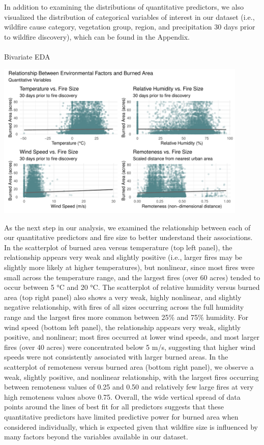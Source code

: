 \documentclass[
  letterpaper,
  DIV=11,
  numbers=noendperiod]{scrartcl}
\makeatletter
\let\oldparagraph\paragraph
\renewcommand{\paragraph}{
    \@ifstar
      \xxxParagraphStar
      \xxxParagraphNoStar
  }
\newcommand{\xxxParagraphStar}[1]{\oldparagraph*{#1}\mbox{}}
\newcommand{\xxxParagraphNoStar}[1]{\oldparagraph{#1}\mbox{}}
\makeatother
\begin{document}
In addition to examining the distributions of quantitative predictors,
we also visualized the distribution of categorical variables of interest
in our dataset (i.e., wildfire cause category, vegetation group, region,
and precipitation 30 days prior to wildfire discovery), which can be
found in the Appendix.

\FloatBarrier

\paragraph{Bivariate EDA}\label{bivariate-eda}

\includegraphics[width=0.9\textwidth,height=\textheight]{written-report_files/figure-pdf/fire-size-bivariate-1.pdf}

As the next step in our analysis, we examined the relationship between
each of our quantitative predictors and fire size to better understand
their associations. In the scatterplot of burned area versus temperature
(top left panel), the relationship appears very weak and slightly
positive (i.e., larger fires may be slightly more likely at higher
temperatures), but nonlinear, since most fires were small across the
temperature range, and the largest fires (over 60 acres) tended to occur
between 5 °C and 20 °C. The scatterplot of relative humidity versus
burned area (top right panel) also shows a very weak, highly nonlinear,
and slightly negative relationship, with fires of all sizes occurring
across the full humidity range and the largest fires more common between
25\% and 75\% humidity. For wind speed (bottom left panel), the
relationship appears very weak, slightly positive, and nonlinear; most
fires occurred at lower wind speeds, and most larger fires (over 40
acres) were concentrated below 5 m/s, suggesting that higher wind speeds
were not consistently associated with larger burned areas. In the
scatterplot of remoteness versus burned area (bottom right panel), we
observe a weak, slightly positive, and nonlinear relationship, with the
largest fires occurring between remoteness values of 0.25 and 0.50 and
relatively few large fires at very high remoteness values above 0.75.
Overall, the wide vertical spread of data points around the lines of
best fit for all predictors suggests that these quantitative predictors
have limited predictive power for burned area when considered
individually, which is expected given that wildfire size is influenced
by many factors beyond the variables available in our dataset.
\end{document}
